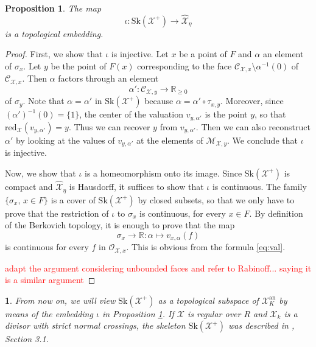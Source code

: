 \documentclass{amsart}%
\numberwithin{equation}{subsection}
\theoremstyle{plain2}
\newtheorem{prop}[equation]{Proposition}
\theoremstyle{definition2}
\theoremstyle{stepstyle}
\theoremstyle{point}
\theoremstyle{subpoint}
\newtheorem{subpoint}[equation]{}%
\newcommand{\spa}[1]{\begin{subpoint}#1\end{subpoint}}           %
\newcommand{\R}{\ensuremath{\mathbb{R}}}
\newcommand{\cX}{\ensuremath{\mathscr{X}}}
\renewcommand{\R}{\ensuremath{\mathbb{R}}}
\newcommand{\redu}{\mathrm{red}}
\newcommand{\an}{\mathrm{an}}
\newcommand{\Sk}{\mathrm{Sk}}
\begin{document}
\begin{prop}\label{prop-embed}
The map $$\iota:\Sk(\cX^+)\to \widehat{\cX}_\eta$$  is a
topological embedding.
\end{prop}
\begin{proof}
First, we show that $\iota$ is injective. Let $x$ be a point of $F$ and $\alpha$ an element of $\sigma_x$. Let $y$ be the point of $F(x)$ corresponding to the face $\mathcal{C}_{\cX,x}\setminus
\alpha^{-1}(0)$ of $\mathcal{C}_{\cX,x}$. Then $\alpha$ factors through an element
$$\alpha':\mathcal{C}_{\cX,y}\to \R_{\geq 0}$$ of $\sigma_y$.  Note that $\alpha=\alpha'$ in $\Sk(\cX^+)$ because $\alpha=\alpha'\circ \tau_{x,y}$.
Moreover, since $(\alpha')^{-1}(0)=\{1\}$, the center of the valuation $v_{y,\alpha'}$ is the point $y$, so that
$\redu_{\cX}(v_{y,\alpha'})=y$. Thus we can recover $y$ from
$v_{y,\alpha'}$. Then we can also reconstruct $\alpha'$ by looking at the values of $v_{y,\alpha'}$ at the elements of $\mathcal{M}_{\cX,y}$. We conclude that $\iota$ is injective.

Now, we show that $\iota$ is a homeomorphism onto its image. Since $\Sk(\cX^+)$ is compact and $\widehat{\cX}_\eta$ is Hausdorff, it suffices to show that $\iota$ is continuous. The family $\{\sigma_x,\,x\in F\}$ is a cover of $\Sk(\cX^+)$ by closed subsets, so that we only have to prove that the restriction of $\iota$ to $\sigma_x$ is continuous, for every $x\in F$. By definition of the Berkovich topology, it is enough to prove that the map $$\sigma_x\to \R:\alpha\mapsto v_{x,\alpha}(f)$$ is continuous for every $f$ in $\mathcal{O}_{\cX,x}$. This is obvious from the formula \eqref{eq:val}.

\textcolor{red}{adapt the argument considering unbounded faces and refer to Rabinoff... saying it is a similar argument}
\end{proof}

\spa{From now on, we will view $\Sk(\cX^+)$ as a topological subspace of $\cX_K^{\an}$ by means of the embedding $\iota$ in Proposition \ref{prop-embed}. If $\cX$ is regular over $R$ and $\cX_k$ is a divisor with strict normal crossings, the skeleton $\Sk(\cX^+)$ was described in \cite{MustataNicaise}, Section 3.1.}
\end{document}
